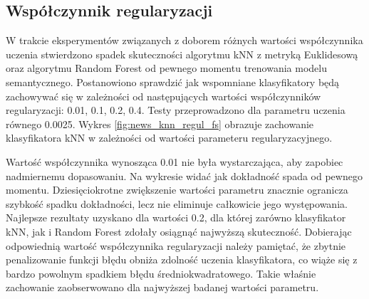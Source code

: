 \documentclass{pracamgr}
\begin{document}
\begin{table}[]
\centering
{}
\caption{Porównanie najlepszych wyników klasyfikacji ze względu na metodę obliczania wagi i współczynnik uczenia}
\label{weight_tab}
\end{table}

\subsection{Współczynnik regularyzacji}

W trakcie eksperymentów związanych z doborem różnych wartości współczynnika uczenia stwierdzono spadek skuteczności algorytmu kNN z metryką Euklidesową oraz algorytmu Random Forest od pewnego momentu trenowania modelu semantycznego. Postanowiono sprawdzić jak wspomniane klasyfikatory będą zachowywać się w zależności od następujących wartości współczynników regularyzacji: 0.01, 0.1, 0.2, 0.4. Testy przeprowadzono dla parametru uczenia równego 0.0025. 
Wykres \ref{fig:news_knn_regul_fs} obrazuje zachowanie klasyfikatora kNN w zależności od wartości parameteru regularyzacyjnego.

Wartość współczynnika wynosząca 0.01 nie była wystarczająca, aby zapobiec nadmiernemu dopasowaniu. Na wykresie widać jak dokładność spada od pewnego momentu. Dziesięciokrotne zwiększenie wartości parametru znacznie ogranicza szybkość spadku dokładności, lecz nie eliminuje całkowicie jego występowania. Najlepsze rezultaty uzyskano dla wartości 0.2, dla której zarówno klasyfikator kNN, jak i Random Forest zdołały osiągnąć najwyższą skuteczność. Dobierając odpowiednią wartość współczynnika regularyzacji należy pamiętać, że zbytnie penalizowanie funkcji błędu obniża zdolność uczenia klasyfikatora, co wiąże się z bardzo powolnym spadkiem błędu średniokwadratowego. Takie właśnie zachowanie zaobserwowano dla najwyższej badanej wartości parametru.
\end{document}
